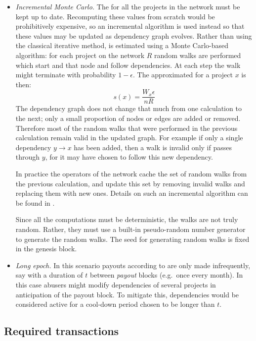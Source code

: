 \begin{itemize}
  \item \emph{Incremental Monte Carlo.} The \srcrank{}
    for all the projects in the network must be kept up to
    date. Recomputing these values from scratch would be prohibitively
    expensive, so an incremental algorithm is used instead so that
    these values may be updated as dependency graph evolves. Rather
    than using the classical iterative method, \srcrank{} is estimated
    using a Monte Carlo-based algorithm: for each project on the
    network $R$ random walks are performed which start and that node
    and follow dependencies. At each step the walk might terminate
    with probability $1 - \epsilon$. The approximated \srcrank{} for a
    project $x$ is then:
    \[
    s(x) = \frac{W_x \epsilon}{n R}
    \]
    The dependency graph does not change that much from one
    calculation to the next; only a small proportion of nodes or edges
    are added or removed. Therefore most of the random walks that were
    performed in the previous calculation remain valid in the updated
    graph. For example if only a single dependency $y \to x$ has been
    added, then a walk is invalid only if passes through $y$, for it
    may have chosen to follow this new dependency.

    In practice the operators of the network cache the set of random
    walks from the previous calculation, and update this set by
    removing invalid walks and replacing them with new ones. Details
    on such an incremental algorithm can be found in
    \cite{incr_pagerank}.

    Since all the computations must be deterministic, the walks are
    not truly random. Rather, they must use a built-in pseudo-random
    number generator to generate the random walks. The seed for
    generating random walks is fixed in the genesis block.

\item \emph{Long epoch.} In this scenario payouts according to
  \srcrank{} are only made infrequently, say with a duration of $t$
  between \emph{payout} blocks (e.g.\ once every month). In this case
  abusers might modify dependencies of several projects in
  anticipation of the payout block. To mitigate this, dependencies
  would be considered active for a cool-down period chosen to be
  longer than $t$.
\end{itemize}
  
\subsection{Required transactions}

